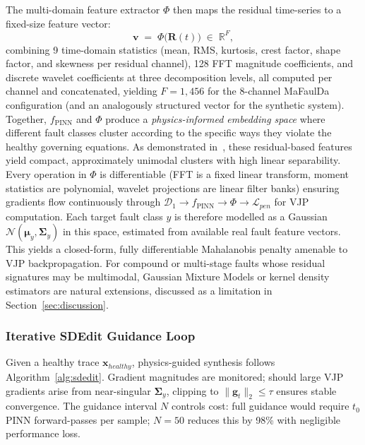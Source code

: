 \documentclass[conference]{IEEEtran}
\newcommand{\DecOne}{\mathcal{D}_1}
\newcommand{\PINN}{f_{\text{PINN}}}
\newcommand{\Feat}{\Phi}
\newcommand{\x}{\mathbf{x}}
\newcommand{\bv}{\mathbf{v}}          %
\newcommand{\g}{\mathbf{g}}
\newcommand{\R}{\mathbf{R}}
\newcommand{\muvec}{\boldsymbol{\mu}}
\newcommand{\Sigmamat}{\boldsymbol{\Sigma}}
\begin{document}
The multi-domain feature extractor $\Feat$ then maps the residual time-series to a fixed-size feature vector:
\begin{equation}
  \bv \;=\; \Feat\!\bigl(\R(t)\bigr) \;\in\; \mathbb{R}^F,
  \label{eq:features}
\end{equation}
combining 9 time-domain statistics (mean, RMS, kurtosis, crest factor, shape factor, and skewness per residual channel), 128 FFT magnitude coefficients, and discrete wavelet coefficients at three decomposition levels, all computed per channel and concatenated, yielding $F=1{,}456$ for the 8-channel MaFaulDa configuration (and an analogously structured vector for the synthetic system). Together, $\PINN$ and $\Feat$ produce a \emph{physics-informed embedding space} where different fault classes cluster according to the specific ways they violate the healthy governing equations. As demonstrated in~\cite{spotorno2026linking}, these residual-based features yield compact, approximately unimodal clusters with high linear separability. Every operation in $\Feat$ is differentiable (FFT is a fixed linear transform, moment statistics are polynomial, wavelet projections are linear filter banks) ensuring gradients flow continuously through $\DecOne\!\to\!\PINN\!\to\!\Feat\!\to\!\mathcal{L}_{pen}$ for VJP computation. Each target fault class $y$ is therefore modelled as a Gaussian $\mathcal{N}(\muvec_y,\Sigmamat_y)$ in this space, estimated from available real fault feature vectors. This yields a closed-form, fully differentiable Mahalanobis penalty amenable to VJP backpropagation. For compound or multi-stage faults whose residual signatures may be multimodal, Gaussian Mixture Models or kernel density estimators are natural extensions, discussed as a limitation in Section~\ref{sec:discussion}.

\subsubsection{Iterative SDEdit Guidance Loop}

Given a healthy trace $\x_{healthy}$, physics-guided synthesis follows Algorithm~\ref{alg:sdedit}. Gradient magnitudes are monitored; should large VJP gradients arise from near-singular $\Sigmamat_y$, clipping to $\|\g_t\|_2\!\leq\!\tau$ ensures stable convergence. The guidance interval $N$ controls cost: full guidance would require $t_0$ PINN forward-passes per sample; $N\!=\!50$ reduces this by 98\% with negligible performance loss.
\end{document}
